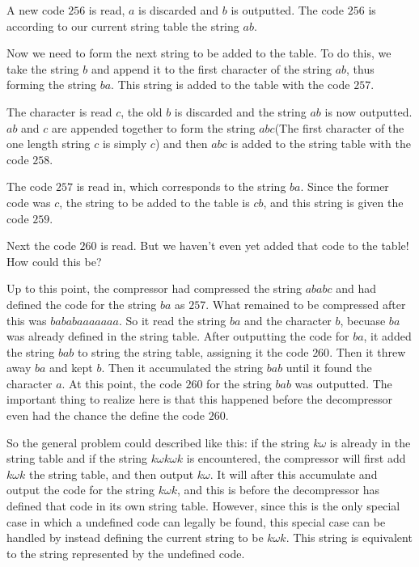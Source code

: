 A new code $256$ is read, $a$ is discarded and $b$ is outputted. The
code $256$ is according to our current string table the string
$ab$.

Now we need to form the next string to be added to the table. To do
this, we take the string $b$ and append it to the first character of
the string $ab$, thus forming the string $ba$. This string is added to
the table with the code $257$.

The character is read $c$, the old $b$ is discarded and the string
$ab$ is now outputted. $ab$ and $c$ are appended together to form the
string $abc$(The first character of the one length string $c$ is
simply $c$) and then $abc$ is added to the string table with
the code $258$.

The code $257$ is read in, which corresponds to the string $ba$. Since
the former code was $c$, the string to be added to the table is $cb$,
and this string is given the code $259$.

Next the code $260$ is read. But we haven't even yet added that code
to the table! How could this be?

Up to this point, the compressor had compressed the string $ababc$ and
had defined the code for the string $ba$ as $257$. What remained to be
compressed after this was $bababaaaaaaa$. So it read the string $ba$
and the character $b$, becuase $ba$ was already defined in the string
table. After outputting the code for $ba$, it added the string $bab$
to string the string table, assigning it the code $260$. Then it threw
away $ba$ and kept $b$. Then it accumulated the string $bab$ until it
found the character $a$. At this point, the code $260$ for the string
$bab$ was outputted.  The important thing to realize here is that this
happened before the decompressor even had the chance the define the
code $260$.

\newcommand{\ko}{\ensuremath{k\omega}\xspace}
\newcommand{\kok}{\ensuremath{\ko k}\xspace}
\newcommand{\kokok}{\ensuremath{\kok \omega k}\xspace}

So the general problem could described like this\cite{welch85:_u}: if
the string \ko is already in the string table and if the string \kokok
is encountered, the compressor will first add \kok the string table,
and then output \ko. It will after this accumulate and output the code
for the string \kok, and this is before the decompressor has defined
that code in its own string table. However, since this is the only
special case in which a undefined code can legally be found, this
special case can be handled by instead defining the current string to
be $\kok$. This string is equivalent to the string represented by the
undefined code.

